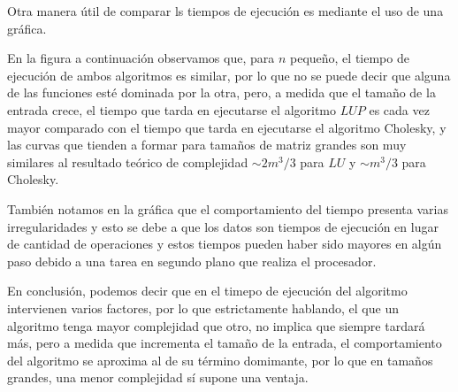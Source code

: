 \documentclass{article}
\begin{document}
\begin{enumerate}
    Otra manera útil de comparar ls tiempos de ejecución es mediante el uso de una gráfica.

    En la figura a continuación observamos que, para $n$ pequeño, el tiempo de ejecución de ambos
    algoritmos es similar, por lo que no se puede decir que alguna de las funciones esté dominada
    por la otra, pero, a medida que el tamaño de la entrada crece, el tiempo que tarda en ejecutarse
    el algoritmo $LUP$ es cada vez mayor comparado con el tiempo que tarda en ejecutarse el
    algoritmo Cholesky, y las curvas que tienden a formar para tamaños de matriz grandes son
    muy similares al resultado teórico de complejidad $\sim 2m^3/3$ para $LU$ y $\sim m^3/3$
    para Cholesky.


    \begin{figure*}[!h] 
        
    \end{figure*}

    También notamos en la gráfica que el comportamiento del tiempo presenta varias irregularidades
    y esto se debe a que los datos son tiempos de ejecución en lugar de cantidad de operaciones
    y estos tiempos pueden haber sido mayores en algún paso debido a una tarea en segundo plano que
    realiza el procesador. 

    En conclusión, podemos decir que en el timepo de ejecución del algoritmo intervienen varios
    factores, por lo que estrictamente hablando, el que un algoritmo tenga mayor complejidad que
    otro, no implica que siempre tardará más, pero a medida que incrementa el tamaño de la entrada,
    el comportamiento del algoritmo se aproxima al de su término domimante, por lo que en tamaños
    grandes, una menor complejidad sí supone una ventaja.
   
\end{enumerate}




 
\end{document}
